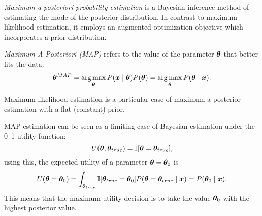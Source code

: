 \emph{Maximum a posteriori probability estimation} is a Bayesian inference method of estimating the mode of the posterior distribution. In contrast to maximum likelihood estimation, it employs an augmented optimization objective which incorporates a prior distribution.

\begin{definition}
  \emph{Maximum A Posteriori (MAP)} refers to the value of the parameter \( \bm{\theta} \) that better fits the data:
  \[
    \bm{\theta}^{MAP} = \operatorname*{arg\,max}_{\bm{\theta}} P(\bm{x} \mid \bm{\theta})P(\bm{\theta}) = \operatorname*{arg\,max}_{\bm{\theta}} P(\bm{\theta} \mid \bm{x}).
  \]
\end{definition}

\begin{remark}
  Maximum likelihood estimation is a particular case of maximum a posterior estimation with a flat (constant) prior.
\end{remark}

\begin{remark}
  MAP estimation can be seen as a limiting case of Bayesian estimation under the 0–1 utility function:
  \[
    U(\bm{\theta}, \bm{\theta}_{true}) = \mathbb{I}[\bm{\theta} = \bm{\theta}_{true}],
  \]
  using this, the expected utility of a parameter \(\bm{\theta} = \bm{\theta}_0\) is
  \[
    U(\bm{\theta} = \bm{\theta}_0) = \int_{\bm{\theta}_{true}}\mathbb{I}[\bm{\theta}_{true} = \bm{\theta}_0]P(\bm{\theta} = \bm{\theta}_{true}  \mid  \bm{x}) = P(\bm{\theta}_0  \mid  \bm{x}).
  \]
  This means that the maximum utility decision is to take the value \(\bm{\theta}_0\) with the highest posterior value.
\end{remark}
